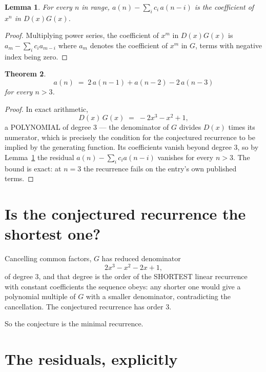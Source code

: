 \documentclass[11pt,a4paper]{article}
\theoremstyle{plain}
\newtheorem{theorem}{Theorem}
\newtheorem{lemma}[theorem]{Lemma}
\theoremstyle{definition}
\begin{document}
\begin{lemma}\label{lem:key}
For every $n$ in range, $a(n)-\sum_i c_i\,a(n-i)$ is the coefficient of $x^{n}$ in
$D(x)G(x)$.
\end{lemma}

\begin{proof}
Multiplying power series, the coefficient of $x^{m}$ in $D(x)G(x)$ is
$a_m-\sum_i c_i a_{m-i}$ where $a_m$ denotes the coefficient of $x^{m}$ in $G$, terms with
negative index being zero.
\end{proof}

\begin{theorem}
\[
a(n)\;=\;2\,a(n-1) + a(n-2) - 2\,a(n-3)
\]
for every $n>3$.
\end{theorem}

\begin{proof}
In exact arithmetic,
\[
D(x)\,G(x)\;=\;- 2 x^{3} - x^{2} + 1,
\]
a POLYNOMIAL of degree $3$ --- the denominator of $G$ divides $D(x)$ times its numerator,
which is precisely the condition for the conjectured recurrence to be implied by the
generating function. Its coefficients vanish beyond degree $3$, so by
Lemma~\ref{lem:key} the residual $a(n)-\sum_ic_ia(n-i)$ vanishes for every
$n>3$. The bound is exact: at $n=3$ the recurrence fails on the entry's own published terms.
\end{proof}

\section{Is the conjectured recurrence the shortest one?}

Cancelling common factors, $G$ has reduced denominator
\[
2 x^{3} - x^{2} - 2 x + 1,
\]
of degree $3$, and that degree is the order of the SHORTEST linear recurrence with
constant coefficients the sequence obeys: any shorter one would give a polynomial multiple of
$G$ with a smaller denominator, contradicting the cancellation. The conjectured recurrence has
order $3$.

So the conjecture is the minimal recurrence.

\section{The residuals, explicitly}
\end{document}

